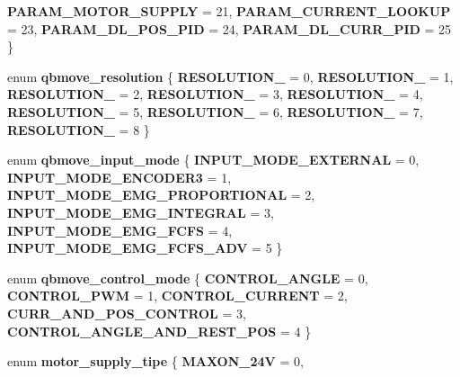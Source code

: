 \begin{DoxyCompactItemize}
\newline
\textbf{ P\+A\+R\+A\+M\+\_\+\+M\+O\+T\+O\+R\+\_\+\+S\+U\+P\+P\+LY} = 21, 
\textbf{ P\+A\+R\+A\+M\+\_\+\+C\+U\+R\+R\+E\+N\+T\+\_\+\+L\+O\+O\+K\+UP} = 23, 
\textbf{ P\+A\+R\+A\+M\+\_\+\+D\+L\+\_\+\+P\+O\+S\+\_\+\+P\+ID} = 24, 
\textbf{ P\+A\+R\+A\+M\+\_\+\+D\+L\+\_\+\+C\+U\+R\+R\+\_\+\+P\+ID} = 25
 \}
\item 
\mbox{\label{commands_8h_ad18f2ef316ee226b52882af5758c39e8}} 
enum {\bfseries qbmove\+\_\+resolution} \{ \newline
{\bfseries R\+E\+S\+O\+L\+U\+T\+I\+O\+N\+\_} = 0, 
{\bfseries R\+E\+S\+O\+L\+U\+T\+I\+O\+N\+\_} = 1, 
{\bfseries R\+E\+S\+O\+L\+U\+T\+I\+O\+N\+\_} = 2, 
{\bfseries R\+E\+S\+O\+L\+U\+T\+I\+O\+N\+\_} = 3, 
\newline
{\bfseries R\+E\+S\+O\+L\+U\+T\+I\+O\+N\+\_} = 4, 
{\bfseries R\+E\+S\+O\+L\+U\+T\+I\+O\+N\+\_} = 5, 
{\bfseries R\+E\+S\+O\+L\+U\+T\+I\+O\+N\+\_} = 6, 
{\bfseries R\+E\+S\+O\+L\+U\+T\+I\+O\+N\+\_} = 7, 
\newline
{\bfseries R\+E\+S\+O\+L\+U\+T\+I\+O\+N\+\_} = 8
 \}
\item 
enum \textbf{ qbmove\+\_\+input\+\_\+mode} \{ \newline
\textbf{ I\+N\+P\+U\+T\+\_\+\+M\+O\+D\+E\+\_\+\+E\+X\+T\+E\+R\+N\+AL} = 0, 
\textbf{ I\+N\+P\+U\+T\+\_\+\+M\+O\+D\+E\+\_\+\+E\+N\+C\+O\+D\+E\+R3} = 1, 
\textbf{ I\+N\+P\+U\+T\+\_\+\+M\+O\+D\+E\+\_\+\+E\+M\+G\+\_\+\+P\+R\+O\+P\+O\+R\+T\+I\+O\+N\+AL} = 2, 
\textbf{ I\+N\+P\+U\+T\+\_\+\+M\+O\+D\+E\+\_\+\+E\+M\+G\+\_\+\+I\+N\+T\+E\+G\+R\+AL} = 3, 
\newline
\textbf{ I\+N\+P\+U\+T\+\_\+\+M\+O\+D\+E\+\_\+\+E\+M\+G\+\_\+\+F\+C\+FS} = 4, 
\textbf{ I\+N\+P\+U\+T\+\_\+\+M\+O\+D\+E\+\_\+\+E\+M\+G\+\_\+\+F\+C\+F\+S\+\_\+\+A\+DV} = 5
 \}
\item 
enum \textbf{ qbmove\+\_\+control\+\_\+mode} \{ \newline
\textbf{ C\+O\+N\+T\+R\+O\+L\+\_\+\+A\+N\+G\+LE} = 0, 
\textbf{ C\+O\+N\+T\+R\+O\+L\+\_\+\+P\+WM} = 1, 
\textbf{ C\+O\+N\+T\+R\+O\+L\+\_\+\+C\+U\+R\+R\+E\+NT} = 2, 
\textbf{ C\+U\+R\+R\+\_\+\+A\+N\+D\+\_\+\+P\+O\+S\+\_\+\+C\+O\+N\+T\+R\+OL} = 3, 
\newline
\textbf{ C\+O\+N\+T\+R\+O\+L\+\_\+\+A\+N\+G\+L\+E\+\_\+\+A\+N\+D\+\_\+\+R\+E\+S\+T\+\_\+\+P\+OS} = 4
 \}
\item 
\mbox{\label{commands_8h_a17c218160a8b2c5f25db27616793d564}} 
enum {\bfseries motor\+\_\+supply\+\_\+tipe} \{ {\bfseries M\+A\+X\+O\+N\+\_\+24V} = 0, 

\end{DoxyCompactItemize}
